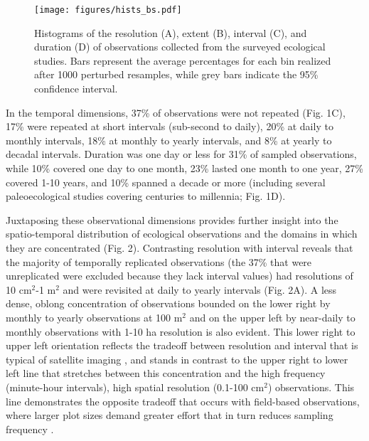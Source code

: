 \documentclass[12pt]{article}
\begin{document}

\begin{figure}[!ht]
\texttt{[image: figures/hists\_bs.pdf]}
\vspace{-0.15 cm}
\caption{Histograms of the resolution (A), extent (B), interval (C), and duration (D) of observations collected from the surveyed ecological studies. Bars represent the average percentages for each bin realized after 1000 perturbed resamples, while grey bars indicate the 95\% confidence interval. }
\label{afoto1}
\end{figure}

In the temporal dimensions, 37\% of observations were not repeated (Fig. 1C), 17\% were repeated at short intervals (sub-second to daily), 20\% at daily to monthly intervals, 18\% at monthly to yearly intervals, and 8\% at yearly to decadal intervals. Duration was one day or less for 31\% of sampled observations, while 10\% covered one day to one month, 23\% lasted one month to one year, 27\% covered 1-10 years, and 10\% spanned a decade or more (including several paleoecological studies covering centuries to millennia; Fig. 1D).

Juxtaposing these observational dimensions provides further insight into the spatio-temporal distribution of ecological observations and the domains in which they are concentrated (Fig. 2). Contrasting resolution with interval reveals that the majority of temporally replicated observations (the 37\% that were unreplicated were excluded because they lack interval values) had resolutions of 10 cm$^2$-1 m$^2$ and were revisited at daily to yearly intervals (Fig. 2A). A less dense, oblong concentration of observations bounded on the lower right by monthly to yearly observations at 100 m$^2$ and on the upper left by near-daily to monthly observations with 1-10 ha resolution is also evident. This lower right to upper left orientation reflects the tradeoff between resolution and interval that is typical of satellite imaging \cite{estes_platform_2016}, and stands in contrast to the upper right to lower left line that stretches between this concentration and the high frequency (minute-hour intervals), high spatial resolution (0.1-100 cm$^2$) observations. This line demonstrates the opposite tradeoff that occurs with field-based observations, where larger plot sizes demand greater effort that in turn reduces sampling frequency \cite{kareiva_spatial_1988}.   
\end{document}

